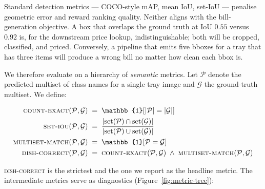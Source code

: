 Standard detection metrics --- COCO-style mAP, mean IoU, set-IoU --- penalise
geometric error and reward ranking quality. Neither aligns with the
bill-generation objective. A box that overlaps the ground truth at IoU $0.55$
versus $0.92$ is, for the downstream price lookup, indistinguishable; both
will be cropped, classified, and priced. Conversely, a pipeline that emits
five bboxes for a tray that has three items will produce a wrong bill no
matter how clean each bbox is.

We therefore evaluate on a hierarchy of \emph{semantic} metrics. Let $\mathcal{P}$
denote the predicted multiset of class names for a single tray image and
$\mathcal{G}$ the ground-truth multiset. We define:

\begin{align}
\textsc{count-exact}(\mathcal{P}, \mathcal{G}) &\;=\; \mathbb{1}[|\mathcal{P}| = |\mathcal{G}|] \\
\textsc{set-iou}(\mathcal{P}, \mathcal{G}) &\;=\; \frac{|\mathrm{set}(\mathcal{P}) \cap \mathrm{set}(\mathcal{G})|}{|\mathrm{set}(\mathcal{P}) \cup \mathrm{set}(\mathcal{G})|} \\
\textsc{multiset-match}(\mathcal{P}, \mathcal{G}) &\;=\; \mathbb{1}[\mathcal{P} = \mathcal{G}] \\
\textsc{dish-correct}(\mathcal{P}, \mathcal{G}) &\;=\; \textsc{count-exact}(\mathcal{P}, \mathcal{G}) \;\wedge\; \textsc{multiset-match}(\mathcal{P}, \mathcal{G})
\end{align}

\textsc{dish-correct} is the strictest and the one we report as the
headline metric. The intermediate metrics serve as diagnostics
(Figure~\ref{fig:metric-tree}):


